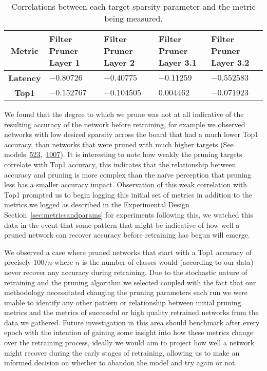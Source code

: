 \documentclass[../Dissertation.tex]{subfiles}
\begin{document}
\singlespacing
\begin{table}[H]
    \centering
    \begin{tabular}{@{}cp{26mm}p{26mm}p{26mm}p{26mm}@{}}
    \toprule
    \textbf{Metric}  & \textbf{Filter Pruner  Layer 1} & \textbf{Filter Pruner Layer 2} & \textbf{Filter Pruner Layer 3.1} & \textbf{Filter Pruner Layer 3.2} \\ \midrule
    \textbf{Latency} & $-0.80726$                        & $-0.40775$                      & $-0.11259$                         & $-0.552583$                         \\
    \textbf{Top1}    & $-0.152767$                       & $-0.104505$                     & $0.004462$                        & $-0.071923$                     \\ \bottomrule
    \end{tabular}
    \caption{Correlations between each target sparsity parameter and the metric being measured.}
    \label{tab:fastPruneCorrelations}
\end{table}
\doublespacing

We found that the degree to which we prune was not at all indicative of the resulting accuracy of the network before retraining, for example we observed networks with low desired sparsity across the board that had a much lower Top1 accuracy, than networks that were pruned with much higher targets (See models~\hyperref[sec:golden-sweep-523]{523},~\hyperref[sec:comfy-sweep-1007]{1007}).
It is interesting to note how weakly the pruning targets correlate with Top1 accuracy, this indicates that the relationship between accuracy and pruning is more complex than the naïve perception that pruning less has a smaller accuracy impact.
Observation of this weak correlation with Top1 prompted us to begin logging this initial set of metrics in addition to the metrics we logged as described in the Experimental Design Section~\ref{sec:metricsandparams} for experiments following this, we watched this data in the event that some pattern that might be indicative of how well a pruned network can recover accuracy before retraining has begun will emerge.

We observed a case where pruned networks that start with a Top1 accuracy of precisely $100 / n$ where $n$ is the number of classes would (according to our data) never recover any accuracy during retraining.
Due to the stochastic nature of retraining and the pruning algorithm we selected coupled with the fact that our methodology necessitated changing the pruning parameters each run we were unable to identify any other pattern or relationship between initial pruning metrics and the metrics of successful or high quality retrained networks from the data we gathered. 
Future investigation in this area should benchmark after every epoch with the intention of gaining some insight into how these metrics change over the retraining process, ideally we would aim to project how well a network might recover during the early stages of retraining, allowing us to make an informed decision on whether to abandon the model and try again or not.
\end{document}
